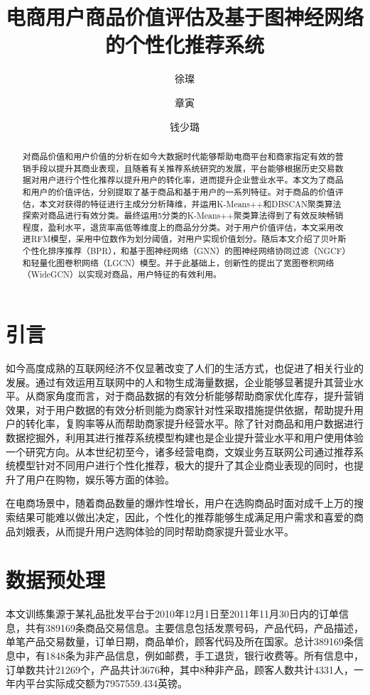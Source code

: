 \documentclass[lang=cn,11pt,a4paper,cite=authoryear]{elegantpaper}
\title{电商用户商品价值评估及基于图神经网络的个性化推荐系统}
\author{徐璨 \and 章寅 \and 钱少璐}
\institute{浙江工商大学}
\date{\zhtoday}
\begin{document}
\maketitle

\begin{abstract}
  对商品价值和用户价值的分析在如今大数据时代能够帮助电商平台和商家指定有效的营销手段以提升其商业表现，且随着有关推荐系统研究的发展，平台能够根据历史交易数据对用户进行个性化推荐以提升用户的转化率，进而提升企业营业水平。本文为了商品和用户的价值评估，分别提取了基于商品和基于用户的一系列特征。对于商品的价值评估，本文对获得的特征进行主成分分析降维，并运用K-Means++和DBSCAN聚类算法探索对商品进行有效分类。最终运用5分类的K-Means++聚类算法得到了有效反映畅销程度，盈利水平，退货率高低等维度上的商品分分类。对于用户价值评估，本文采用改进RFM模型，采用中位数作为划分阈值，对用户实现价值划分。随后本文介绍了贝叶斯个性化排序推荐（BPR），和基于图神经网络（GNN）的图神经网络协同过滤（NGCF）和轻量化图卷积网络（LGCN）模型。并于此基础上，创新性的提出了宽图卷积网络（WideGCN）以实现对商品，用户特征的有效利用。
\end{abstract}


\section{引言}

如今高度成熟的互联网经济不仅显著改变了人们的生活方式，也促进了相关行业的发展。通过有效运用互联网中的人和物生成海量数据，企业能够显著提升其营业水平。从商家角度而言，对于商品数据的有效分析能够帮助商家优化库存，提升营销效果，对于用户数据的有效分析则能为商家针对性采取措施提供依据，帮助提升用户的转化率，复购率等从而帮助商家提升经营水平。除了针对商品和用户数据进行数据挖掘外，利用其进行推荐系统模型构建也是企业提升营业水平和用户使用体验一个研究方向。从本世纪初至今，诸多经营电商，文娱业务互联网公司通过推荐系统模型针对不同用户进行个性化推荐，极大的提升了其企业商业表现的同时，也提升了用户在购物，娱乐等方面的体验。

在电商场景中，随着商品数量的爆炸性增长，用户在选购商品时面对成千上万的搜索结果可能难以做出决定，因此，个性化的推荐能够生成满足用户需求和喜爱的商品刘娥表，从而提升用户选购体验的同时帮助商家提升营业水平。

\section{数据预处理}

本文训练集源于某礼品批发平台于2010年12月1日至2011年11月30日内的订单信息，共有389169条商品交易信息。主要信息包括发票号码，产品代码，产品描述，单笔产品交易数量，订单日期，商品单价，顾客代码及所在国家。总计389169条信息中，有1848条为非产品信息，例如邮费，手工退货，银行收费等。所有信息中，订单数共计21269个，产品共计3676种，其中8种非产品，顾客人数共计4331人，一年内平台实际成交额为7957559.434英镑。
\end{document}
